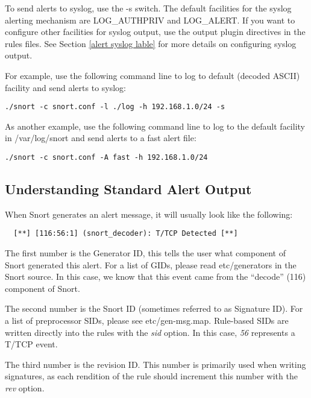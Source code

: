\documentclass[english]{report}
\begin{document}
To send alerts to syslog, use the -s switch. The default facilities
for the syslog alerting mechanism are LOG\_AUTHPRIV and LOG\_ALERT.
If you want to configure other facilities for syslog output, use the
output plugin directives in the rules files. See Section \ref{alert syslog lable}
for more details on configuring syslog output.

For example, use the following command line to log to default (decoded ASCII) facility and send alerts to syslog: 

\begin{verbatim}
./snort -c snort.conf -l ./log -h 192.168.1.0/24 -s
\end{verbatim}

As another example, use the following command line to log to the default facility in /var/log/snort and send alerts to a
fast alert file: 

\begin{verbatim}
./snort -c snort.conf -A fast -h 192.168.1.0/24
\end{verbatim}

\subsection{Understanding Standard Alert Output}

When Snort generates an alert message, it will usually look like the following:
 
 \begin{verbatim}	 
  [**] [116:56:1] (snort_decoder): T/TCP Detected [**]
 \end{verbatim}
  	 
  The first number is the Generator ID, this tells the user what
  component of Snort generated this alert. For a list of GIDs, please read
  etc/generators in the Snort source. In this case, we know that this event
  came from the ``decode'' (116) component of Snort.
  	 
  The second number is the Snort ID (sometimes referred to as
  Signature ID). For a list of preprocessor SIDs, please see
  etc/gen-msg.map.  Rule-based SIDs are written directly into the rules
  with the \emph{sid} option. In this case, \emph{56} represents a T/TCP event.
  	 
  The third number is the revision ID. This number is primarily
  used when writing signatures, as each rendition of the rule should
  increment this number with the \emph{rev} option.
\end{document}
